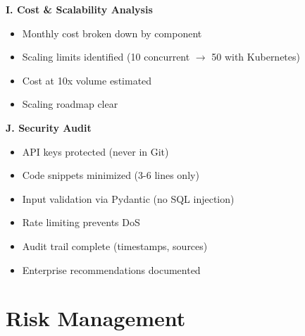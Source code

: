 \documentclass[11pt,a4paper]{article}
\begin{document}
\textbf{I. Cost \& Scalability Analysis}
\begin{itemize}[leftmargin=*]
    \item[$\checkmark$] Monthly cost broken down by component
    \item[$\checkmark$] Scaling limits identified (10 concurrent $\rightarrow$ 50 with Kubernetes)
    \item[$\checkmark$] Cost at 10x volume estimated
    \item[$\checkmark$] Scaling roadmap clear
\end{itemize}

\textbf{J. Security Audit}
\begin{itemize}[leftmargin=*]
    \item[$\checkmark$] API keys protected (never in Git)
    \item[$\checkmark$] Code snippets minimized (3-6 lines only)
    \item[$\checkmark$] Input validation via Pydantic (no SQL injection)
    \item[$\checkmark$] Rate limiting prevents DoS
    \item[$\checkmark$] Audit trail complete (timestamps, sources)
    \item[$\checkmark$] Enterprise recommendations documented
\end{itemize}

\section{Risk Management}
\end{document}
